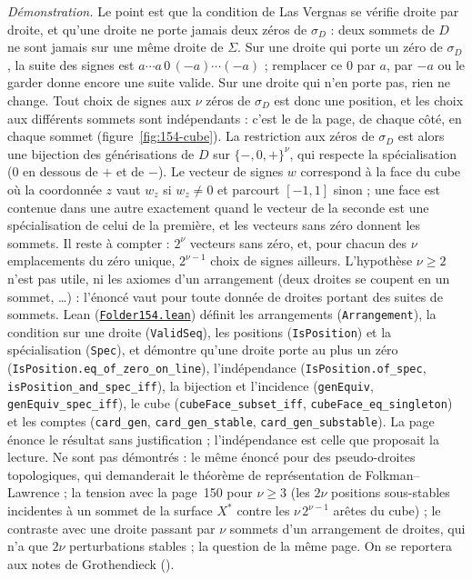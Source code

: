 {\small \emph{Démonstration.} Le point est que la condition de Las Vergnas se vérifie droite par droite, et qu'une droite ne porte jamais deux zéros de $\sigma_D$ : deux sommets de $D$ ne sont jamais sur une même droite de $\Sigma$. Sur une droite qui porte un zéro de $\sigma_D$, la suite des signes est $a \cdots a\, 0\, (-a) \cdots (-a)$ ; remplacer ce $0$ par $a$, par $-a$ ou le garder donne encore une suite valide. Sur une droite qui n'en porte pas, rien ne change. Tout choix de signes aux $\nu$ zéros de $\sigma_D$ est donc une position, et les choix aux différents sommets sont indépendants : c'est le  de la page, de chaque côté, en chaque sommet (figure~\ref{fig:154-cube}). La restriction aux zéros de $\sigma_D$ est alors une bijection des générisations de $D$ sur $\{-, 0, +\}^\nu$, qui respecte la spécialisation ($0$ en dessous de $+$ et de $-$). Le vecteur de signes $w$ correspond à la face du cube où la coordonnée $z$ vaut $w_z$ si $w_z \neq 0$ et parcourt $[-1, 1]$ sinon ; une face est contenue dans une autre exactement quand le vecteur de la seconde est une spécialisation de celui de la première, et les vecteurs sans zéro donnent les sommets. Il reste à compter : $2^\nu$ vecteurs sans zéro, et, pour chacun des $\nu$ emplacements du zéro unique, $2^{\nu-1}$ choix de signes ailleurs. L'hypothèse $\nu \geq 2$ n'est pas utile, ni les axiomes d'un arrangement (deux droites se coupent en un sommet, \dots) : l'énoncé vaut pour toute donnée de droites portant des suites de sommets. Lean (\href{\leanblob/Combinatorics/Folder154.lean}{\texttt{Folder154.\allowbreak{}lean}}) définit les arrangements (\texttt{Arrangement}), la condition sur une droite (\texttt{ValidSeq}), les positions (\texttt{IsPosition}) et la spécialisation (\texttt{Spec}), et démontre qu'une droite porte au plus un zéro (\texttt{IsPosition.\allowbreak{}eq\_of\_zero\_on\_line}), l'indépendance (\texttt{IsPosition.\allowbreak{}of\_spec}, \texttt{isPosition\_and\_spec\_iff}), la bijection et l'incidence (\texttt{genEquiv}, \texttt{genEquiv\_spec\_iff}), le cube (\texttt{cubeFace\_subset\_iff}, \texttt{cubeFace\_eq\_singleton}) et les comptes (\texttt{card\_gen}, \texttt{card\_gen\_stable}, \texttt{card\_gen\_substable}). La page énonce le résultat sans justification ; l'indépendance est celle que proposait la lecture. Ne sont pas démontrés : le même énoncé pour des pseudo-droites topologiques, qui demanderait le théorème de représentation de Folkman--Lawrence ; la tension avec la page~150 pour $\nu \geq 3$ (les $2\nu$ positions sous-stables incidentes à un sommet de la surface $X^*$ contre les $\nu\,2^{\nu-1}$ arêtes du cube) ; le contraste avec une droite passant par $\nu$ sommets d'un arrangement de droites, qui n'a que $2\nu$ perturbations stables ; la question de la même page. On se reportera aux notes de Grothendieck ().\par}

